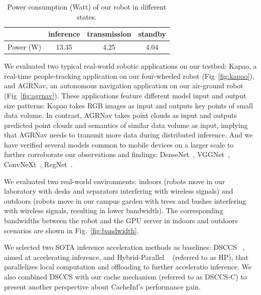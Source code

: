 \begin{table}[!t]
    \centering
    \begin{tabular}{|c|c|c|c|}
    \hline
            & inference & transmission & standby \\ \hline
    Power (W) &     13.35        &       4.25        &    4.04   \\ \hline
    \end{tabular}
    \caption{Power consumption (Watt) of our robot in different states.}
    \label{tab:energydefault}
    \end{table}

We evaluated two typical real-world robotic applications on our testbed: Kapao, a real-time people-tracking application on our four-wheeled robot (Fig~\ref{fig:kapao}), and AGRNav, an autonomous navigation application on our air-ground robot (Fig~\ref{fig:agrnav}). 
These applications feature different model input and output size patterns: Kapao takes RGB images as input and outputs key points of small data volume. In contrast, AGRNav takes point clouds as input and outputs predicted point clouds and semantics of similar data volume as input, implying that AGRNav needs to transmit more data during distributed inference. 
And we have verified several models common to mobile devices on a larger scale to further corroborate our observations and findings: DenseNet~\cite{huang2018densely}, VGGNet~\cite{simonyan2015deep}, ConvNeXt~\cite{woo2023convnext}, RegNet~\cite{xu2022regnet}.

We evaluated two real-world environments: indoors (robots move in our laboratory with desks and separators interfering with wireless signals) and outdoors (robots move in our campus garden with trees and bushes interfering with wireless signals, resulting in lower bandwidth). 
The corresponding bandwidths between the robot and the GPU server in indoors and outdoors scenarios are shown in Fig.~\ref{fig:bandwidth}.

We selected two SOTA inference acceleration methods as baselines: DSCCS ~\cite{liang2023dnn}, aimed at accelerating inference, and Hybrid-Parallel ~\cite{sun2024hybridparallel} (referred to as HP), that parallelizes local computation and offloading to further acceleratio inference. 
We also combined DSCCS with our cache mechanism (referred to as DSCCS-C) to present another perspective about CacheInf's performance gain.

